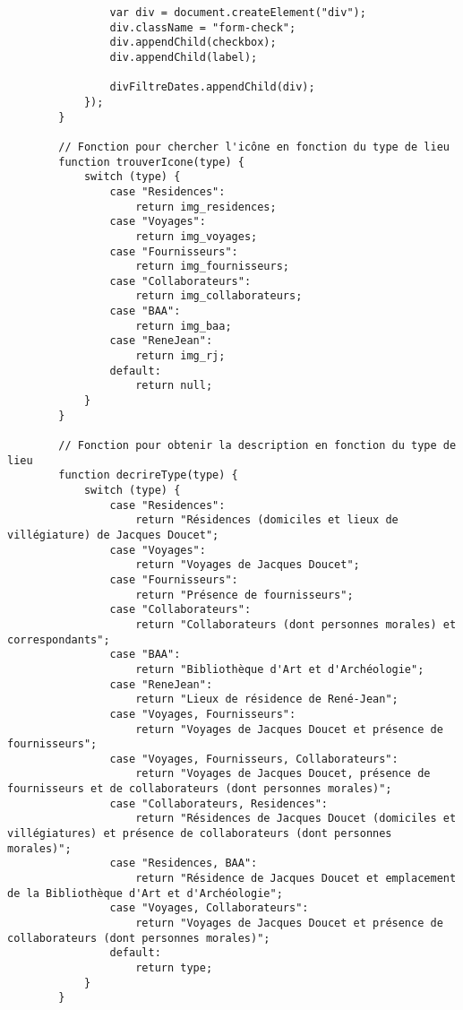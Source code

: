 \begin{verbatim}
                var div = document.createElement("div");
                div.className = "form-check";
                div.appendChild(checkbox);
                div.appendChild(label);

                divFiltreDates.appendChild(div);
            });
        }

        // Fonction pour chercher l'icône en fonction du type de lieu
        function trouverIcone(type) {
            switch (type) {
                case "Residences":
                    return img_residences;
                case "Voyages":
                    return img_voyages;
                case "Fournisseurs":
                    return img_fournisseurs;
                case "Collaborateurs":
                    return img_collaborateurs;
                case "BAA":
                    return img_baa;
                case "ReneJean":
                    return img_rj;
                default:
                    return null;
            }
        }

        // Fonction pour obtenir la description en fonction du type de lieu
        function decrireType(type) {
            switch (type) {
                case "Residences":
                    return "Résidences (domiciles et lieux de villégiature) de Jacques Doucet";
                case "Voyages":
                    return "Voyages de Jacques Doucet";
                case "Fournisseurs":
                    return "Présence de fournisseurs";
                case "Collaborateurs":
                    return "Collaborateurs (dont personnes morales) et correspondants";
                case "BAA":
                    return "Bibliothèque d'Art et d'Archéologie";
                case "ReneJean":
                    return "Lieux de résidence de René-Jean";
                case "Voyages, Fournisseurs":
                    return "Voyages de Jacques Doucet et présence de fournisseurs";
                case "Voyages, Fournisseurs, Collaborateurs":
                    return "Voyages de Jacques Doucet, présence de fournisseurs et de collaborateurs (dont personnes morales)";
                case "Collaborateurs, Residences":
                    return "Résidences de Jacques Doucet (domiciles et villégiatures) et présence de collaborateurs (dont personnes morales)";
                case "Residences, BAA":
                    return "Résidence de Jacques Doucet et emplacement de la Bibliothèque d'Art et d'Archéologie";
                case "Voyages, Collaborateurs":
                    return "Voyages de Jacques Doucet et présence de collaborateurs (dont personnes morales)";
                default:
                    return type;
            }
        }


\end{verbatim}
